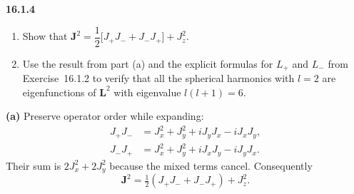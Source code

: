 \par\bigskip
\noindent\textbf{16.1.4}
\begin{enumerate}
\item[(a)] Show that
$\mathbf{J}^{2}=\dfrac{1}{2}\big[J_{+}J_{-}+J_{-}J_{+}\big]+J_{z}^{2}$.
\item[(b)] Use the result from part (a) and the explicit formulas for
$L_{+}$ and $L_{-}$ from Exercise~16.1.2 to verify that all the
spherical harmonics with $l=2$ are eigenfunctions of $\mathbf{L}^{2}$
with eigenvalue $l(l+1)=6$.
\end{enumerate}
\solution
\textbf{(a)} Preserve operator order while expanding:
\[
\begin{aligned}
J_+J_-&=J_x^2+J_y^2+iJ_yJ_x-iJ_xJ_y,\\
J_-J_+&=J_x^2+J_y^2+iJ_xJ_y-iJ_yJ_x.
\end{aligned}
\]
Their sum is $2J_x^2+2J_y^2$ because the mixed terms cancel.
Consequently
\[
\boxed{\mathbf J^2=\tfrac12(J_+J_-+J_-J_+)+J_z^2}.
\]

